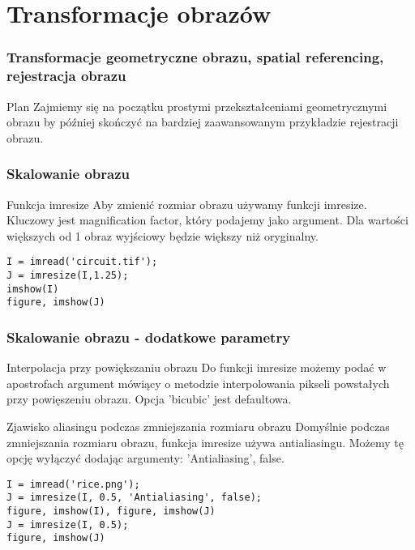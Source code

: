 \documentclass{beamer}
\begin{document}
\section{Transformacje obrazów}

\begin{frame}
\frametitle{Transformacje geometryczne obrazu, spatial referencing, rejestracja obrazu}
\begin{block}{Plan}
Zajmiemy się na początku prostymi przekształceniami geometrycznymi obrazu by później skończyć na bardziej zaawansowanym przykładzie rejestracji obrazu.
\end{block}
\end{frame}

\begin{frame}[fragile]
\frametitle{Skalowanie obrazu}
\begin{block}{Funkcja imresize}
Aby zmienić rozmiar obrazu używamy funkcji imresize. Kluczowy jest magnification factor, który podajemy jako argument. Dla wartości większych od 1 obraz wyjściowy będzie większy niż oryginalny.
\end{block}

\begin{example}
\begin{lstlisting}
I = imread('circuit.tif');
J = imresize(I,1.25);
imshow(I)
figure, imshow(J)
\end{lstlisting}
\end{example}

\end{frame}

\begin{frame}[fragile]
\frametitle{Skalowanie obrazu - dodatkowe parametry}

\begin{block}{Interpolacja przy powiększaniu obrazu}
Do funkcji imresize możemy podać w apostrofach argument mówiący o metodzie interpolowania pikseli powstałych przy powięszeniu obrazu. Opcja 'bicubic' jest defaultowa.
\end{block}

\begin{block}{Zjawisko aliasingu podczas zmniejszania rozmiaru obrazu}
Domyślnie podczas zmniejszania rozmiaru obrazu, funkcja imresize używa antialiasingu. Możemy tę opcję wyłączyć dodając argumenty: 'Antialiasing', false.
\end{block}

\begin{example}
\begin{lstlisting}
I = imread('rice.png');
J = imresize(I, 0.5, 'Antialiasing', false);
figure, imshow(I), figure, imshow(J)
J = imresize(I, 0.5);
figure, imshow(J)
\end{lstlisting}
\end{example}

\end{frame}
\end{document}
